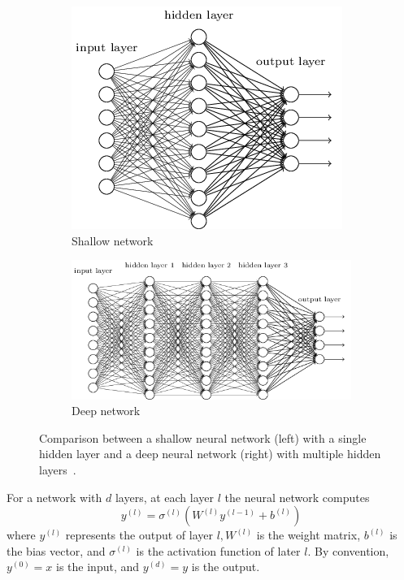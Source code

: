             \newlength{\subfigheight}
            \setlength{\subfigheight}{4cm}
            \begin{figure}
              \centering
              \begin{subfigure}[b]{0.4\textwidth}
                \includegraphics[height=\subfigheight,keepaspectratio]{figures/chapter-03/tikz35.png}
                \caption{Shallow network}
                \label{fig:shallow-nn}
              \end{subfigure}
              \begin{subfigure}[b]{0.5\textwidth}
                \includegraphics[height=\subfigheight,keepaspectratio]{figures/chapter-03/tikz36.png}
                \caption{Deep network}
                \label{fig:deep-nn}
              \end{subfigure}
              \caption[Shallow vs.\ deep NN]{Comparison between a shallow neural network (left) with a single hidden layer and a deep neural network (right) with multiple hidden layers~\cite{nielsen_neural_2015}.}
              \label{fig:shallow-deep}
            \end{figure}

            
            For a network with \(d\) layers, at each layer \(l\) the neural network computes
            \begin{equation}
                y^{(l)} = \sigma^{(l)}(W^{(l)} y^{(l-1)} + b^{(l)})
            \end{equation}
            where \(y^{(l)}\) represents the output of layer \(l, W^{(l)}\) is the weight matrix, \(b^{(l)}\) is the bias vector, and \(\sigma^{(l)}\) is the activation function of later \(l\).
            By convention, \(y^{(0)} = x\) is the input, and \(y^{(d)} = y\) is the output.

